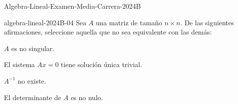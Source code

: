\documentclass[10pt]{article}
\begin{document}
\begin{quiz}{Algebra-Lineal-Examen-Media-Carrera-2024B}

\begin{multi}{algebra-lineal-2024B-04}
Sea $A$ una matriz de tama\~no $n\times n$. De las siguientes afirmaciones, seleccione aquella que no sea equivalente con las dem\'as:
    \item[fraction=0] $A$ es no singular.
    \item[fraction=0] El sistema $Ax=0$ tiene soluci\'on \'unica trivial.
    \item* $A^{-1}$ no existe. 
    \item[fraction=0] El determinante de $A$ es no nulo.
\end{multi} 
\end{quiz}
\end{document}
